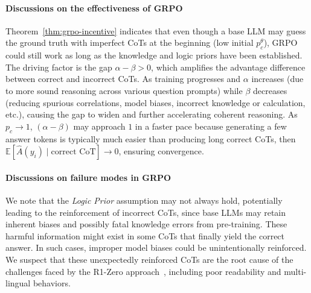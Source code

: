 \paragraph{Discussions on the effectiveness of GRPO}
Theorem~\ref{thm:grpo-incentive} indicates that even though a base LLM may guess the ground truth with imperfect CoTs at the beginning (low initial $p^\theta_c$), GRPO could still work as long as the knowledge and logic priors have been established.
The driving factor is the gap $\alpha - \beta > 0$, which amplifies the advantage difference between correct and incorrect CoTs.
As training progresses and $\alpha$ increases (due to more sound reasoning across various question prompts) while $\beta$ decreases (reducing spurious correlations, model biases, incorrect knowledge or calculation, etc.), causing the gap to widen and further accelerating coherent reasoning.
As $p_c \to 1$, $(\alpha-\beta)$ may approach $1$ in a faster pace because generating a few answer tokens is typically much easier than producing long correct CoTs, then $\mathbb{E}[\hat{A}(y_i) \mid \text{correct CoT}] \to 0$, ensuring convergence.

\paragraph{Discussions on failure modes in GRPO}
We note that the \emph{Logic Prior} assumption may not always hold, potentially leading to the reinforcement of incorrect CoTs, since base LLMs may retain inherent biases and possibly fatal knowledge errors from pre-training. These harmful information might exist in some CoTs that finally yield the correct answer. In such cases, improper model biases could be unintentionally reinforced. We suspect that these unexpectedly reinforced CoTs are the root cause of the challenges faced by the R1-Zero approach~\citep{guo2025deepseek-r1}, including poor readability and multi-lingual behaviors.


